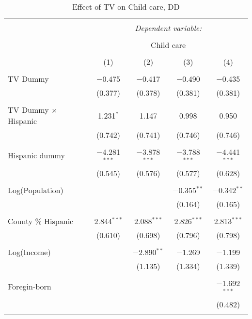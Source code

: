 
\begin{table}[!htbp] \centering 
  \caption{Effect of TV on Child care, DD} 
  \label{} 
\begin{tabular}{@{\extracolsep{-5pt}}lcccc} 
\\[-1.8ex]\hline 
\hline \\[-1.8ex] 
 & \multicolumn{4}{c}{\textit{Dependent variable:}} \\ 
\cline{2-5} 
\\[-1.8ex] & \multicolumn{4}{c}{Child care} \\ 
\\[-1.8ex] & (1) & (2) & (3) & (4)\\ 
\hline \\[-1.8ex] 
 TV Dummy & $-$0.475 & $-$0.417 & $-$0.490 & $-$0.435 \\ 
  & (0.377) & (0.378) & (0.381) & (0.381) \\ 
  & & & & \\ 
 TV Dummy $\times$ Hispanic  & 1.231$^{*}$ & 1.147 & 0.998 & 0.950 \\ 
  & (0.742) & (0.741) & (0.746) & (0.746) \\ 
  & & & & \\ 
 Hispanic dummy & $-$4.281$^{***}$ & $-$3.878$^{***}$ & $-$3.788$^{***}$ & $-$4.441$^{***}$ \\ 
  & (0.545) & (0.576) & (0.577) & (0.628) \\ 
  & & & & \\ 
 Log(Population) &  &  & $-$0.355$^{**}$ & $-$0.342$^{**}$ \\ 
  &  &  & (0.164) & (0.165) \\ 
  & & & & \\ 
 County \% Hispanic & 2.844$^{***}$ & 2.088$^{***}$ & 2.826$^{***}$ & 2.813$^{***}$ \\ 
  & (0.610) & (0.698) & (0.796) & (0.798) \\ 
  & & & & \\ 
 Log(Income) &  & $-$2.890$^{**}$ & $-$1.269 & $-$1.199 \\ 
  &  & (1.135) & (1.334) & (1.339) \\ 
  & & & & \\ 
 Foregin-born &  &  &  & $-$1.692$^{***}$ \\ 
  &  &  &  & (0.482) \\ 
  & & & & \\ 

\end{tabular}
\end{table}
